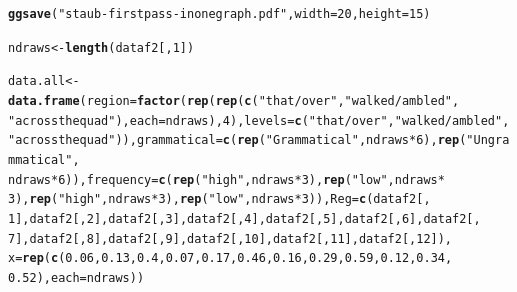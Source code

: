 \documentclass{article}\usepackage[]{graphicx}\usepackage[]{color}
\makeatletter
\newcommand{\hlnum}[1]{\textcolor[rgb]{0.686,0.059,0.569}{#1}}%
\newcommand{\hlstr}[1]{\textcolor[rgb]{0.192,0.494,0.8}{#1}}%
\newcommand{\hlopt}[1]{\textcolor[rgb]{0,0,0}{#1}}%
\newcommand{\hlstd}[1]{\textcolor[rgb]{0.345,0.345,0.345}{#1}}%
\newcommand{\hlkwb}[1]{\textcolor[rgb]{0.69,0.353,0.396}{#1}}%
\newcommand{\hlkwc}[1]{\textcolor[rgb]{0.333,0.667,0.333}{#1}}%
\newcommand{\hlkwd}[1]{\textcolor[rgb]{0.737,0.353,0.396}{\textbf{#1}}}%
\newenvironment{kframe}{%
 \def\at@end@of@kframe{}%
 \ifinner\ifhmode%
  \def\at@end@of@kframe{\end{minipage}}%
  \begin{minipage}{\columnwidth}%
 \fi\fi%
 \def\FrameCommand##1{\hskip\@totalleftmargin \hskip-\fboxsep
 \colorbox{shadecolor}{##1}\hskip-\fboxsep
     \hskip-\linewidth \hskip-\@totalleftmargin \hskip\columnwidth}%
 \MakeFramed {\advance\hsize-\width
   \@totalleftmargin\z@ \linewidth\hsize
   \@setminipage}}%
 {\par\unskip\endMakeFramed%
 \at@end@of@kframe}
\newenvironment{knitrout}{}{} %
\makeatother
\begin{document}
\begin{knitrout}
\color{fgcolor}\begin{kframe}
\begin{alltt}
\hlkwd{ggsave}\hlstd{(}\hlstr{"staub-firstpass-inonegraph.pdf"}\hlstd{,} \hlkwc{width} \hlstd{=} \hlnum{20}\hlstd{,} \hlkwc{height} \hlstd{=} \hlnum{15}\hlstd{)}
\end{alltt}
\end{kframe}
\end{knitrout}

\begin{knitrout}
\color{fgcolor}\begin{kframe}
\begin{alltt}
\hlstd{ndraws} \hlkwb{<-} \hlkwd{length}\hlstd{(dataf2[,} \hlnum{1}\hlstd{])}

\hlstd{data.all} \hlkwb{<-} \hlkwd{data.frame}\hlstd{(}\hlkwc{region} \hlstd{=} \hlkwd{factor}\hlstd{(}\hlkwd{rep}\hlstd{(}\hlkwd{rep}\hlstd{(}\hlkwd{c}\hlstd{(}\hlstr{"that / over"}\hlstd{,} \hlstr{"walked / ambled"}\hlstd{,}
    \hlstr{"across the quad"}\hlstd{),} \hlkwc{each} \hlstd{= ndraws),} \hlnum{4}\hlstd{),} \hlkwc{levels} \hlstd{=} \hlkwd{c}\hlstd{(}\hlstr{"that / over"}\hlstd{,} \hlstr{"walked / ambled"}\hlstd{,}
    \hlstr{"across the quad"}\hlstd{)),} \hlkwc{grammatical} \hlstd{=} \hlkwd{c}\hlstd{(}\hlkwd{rep}\hlstd{(}\hlstr{"Grammatical"}\hlstd{, ndraws} \hlopt{*} \hlnum{6}\hlstd{),} \hlkwd{rep}\hlstd{(}\hlstr{"Ungrammatical"}\hlstd{,}
    \hlstd{ndraws} \hlopt{*} \hlnum{6}\hlstd{)),} \hlkwc{frequency} \hlstd{=} \hlkwd{c}\hlstd{(}\hlkwd{rep}\hlstd{(}\hlstr{"high"}\hlstd{, ndraws} \hlopt{*} \hlnum{3}\hlstd{),} \hlkwd{rep}\hlstd{(}\hlstr{"low"}\hlstd{, ndraws} \hlopt{*}
    \hlnum{3}\hlstd{),} \hlkwd{rep}\hlstd{(}\hlstr{"high"}\hlstd{, ndraws} \hlopt{*} \hlnum{3}\hlstd{),} \hlkwd{rep}\hlstd{(}\hlstr{"low"}\hlstd{, ndraws} \hlopt{*} \hlnum{3}\hlstd{)),} \hlkwc{Reg} \hlstd{=} \hlkwd{c}\hlstd{(dataf2[,}
    \hlnum{1}\hlstd{], dataf2[,} \hlnum{2}\hlstd{], dataf2[,} \hlnum{3}\hlstd{], dataf2[,} \hlnum{4}\hlstd{], dataf2[,} \hlnum{5}\hlstd{], dataf2[,} \hlnum{6}\hlstd{], dataf2[,}
    \hlnum{7}\hlstd{], dataf2[,} \hlnum{8}\hlstd{], dataf2[,} \hlnum{9}\hlstd{], dataf2[,} \hlnum{10}\hlstd{], dataf2[,} \hlnum{11}\hlstd{], dataf2[,} \hlnum{12}\hlstd{]),}
    \hlkwc{x} \hlstd{=} \hlkwd{rep}\hlstd{(}\hlkwd{c}\hlstd{(}\hlnum{0.06}\hlstd{,} \hlnum{0.13}\hlstd{,} \hlnum{0.4}\hlstd{,} \hlnum{0.07}\hlstd{,} \hlnum{0.17}\hlstd{,} \hlnum{0.46}\hlstd{,} \hlnum{0.16}\hlstd{,} \hlnum{0.29}\hlstd{,} \hlnum{0.59}\hlstd{,} \hlnum{0.12}\hlstd{,} \hlnum{0.34}\hlstd{,}
        \hlnum{0.52}\hlstd{),} \hlkwc{each} \hlstd{= ndraws))}


\end{alltt}
\end{kframe}
\end{knitrout}
\end{document}
